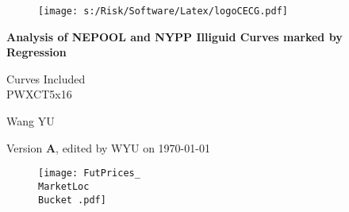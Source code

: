 \documentclass[letterpaper,12pt]{article}
\newcommand{\MarketLoc}{PWXCT}
\newcommand{\Bucket}{5x16}
\begin{document}
\begin{figure}
\texttt{[image: s:/Risk/Software/Latex/logoCECG.pdf]}
\hfill
{}
\end{figure}

\vspace*{0.5in}
\begin{center}
\LARGE\bf{Analysis of NEPOOL and NYPP Illiguid Curves marked by Regression}
\end{center}
\begin{center}
                               Curves Included \\
                               \MarketLoc \Bucket \\
                   
\end{center}
\begin{center}
   Wang YU
\end{center}
\begin{center}
  \small{Version {\bf A}, edited by WYU on \today}
\end{center}
\vspace*{1in}

\newpage
  

\newpage
 
  
\newpage



\newpage
  

\newpage
 

\newpage


\newpage
  
\newpage
   
\newpage


\newpage


\clearpage
\begin{figure}
  \texttt{[image: FutPrices\_\\MarketLoc \\Bucket .pdf]}
\end{figure}
\end{document}
